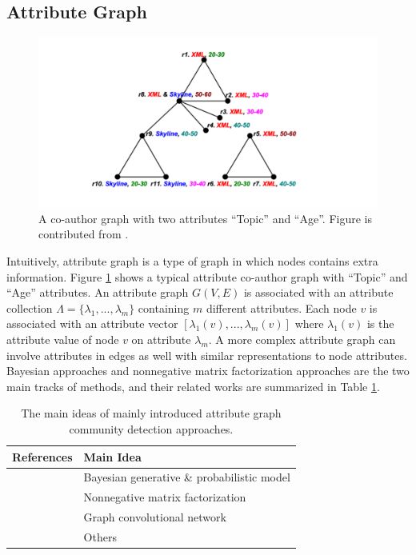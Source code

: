 \subsection{Attribute Graph}

\begin{figure}
	\center
	\includegraphics[width=\columnwidth]{img/chapter2/attribute.pdf} 
	\caption{A co-author graph with two attributes ``Topic'' and ``Age''. Figure is contributed from \cite{yang2013community}.}
	\label{fig:c2_attribute}
\end{figure}  


Intuitively, attribute graph is a type of graph in which nodes contains extra information. Figure \ref{fig:c2_attribute} shows a typical attribute co-author graph with ``Topic'' and ``Age'' attributes. An attribute graph $G(V,E)$ is associated with an attribute collection $\Lambda=\{ \lambda_1,...,\lambda_m\}$ containing $m$ different attributes.  Each node $v$ is associated with an attribute vector $[\lambda_1(v),...,\lambda_m(v)]$ where $\lambda_1(v)$ is the attribute value of node $v$ on attribute $\lambda_m$. A more complex attribute graph can involve attributes in edges as well with similar representations to node attributes.  Bayesian approaches and nonnegative matrix factorization approaches are the two main tracks of methods, and their related works are summarized in Table \ref{tab:c2_attribute}.

\begin{table}
	\centering
	\begin{tabular}{|p{5cm}|p{9cm}|} \hline
		\textbf{References} &  \textbf{Main Idea} \\ \hline
		\cite{xu2012model,han2015probabilistic,bojchevski2018bayesian,he2017joint} & Bayesian generative \& probabilistic model\\ \hline
		\cite{qi2012community,wang2016semantic,qin2018adaptive,}& Nonnegative matrix factorization\\ \hline
		\cite{zhang2019attributed,jin2019graph}& Graph convolutional network \\ \hline 
		\cite{zhou2010clustering,pool2014description,yang2013community,huang2015dense}& Others\\ \hline 
	\end{tabular}
	\caption{The main ideas of mainly introduced attribute graph community detection approaches.}
	\label{tab:c2_attribute}
	
\end{table} 


